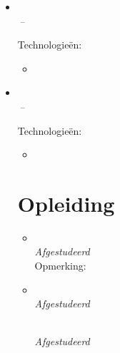 \documentclass[11pt,a4paper]{article}
\begin{document}
\begin{itemize}[leftmargin=0pt,label={},itemsep=2em,topsep=0pt]
\item \parbox{\textwidth}{\textbf{\HSBCNameNL} \hfill \textit{\HSBCLocationNL}}\\
\textit{\HSBCJobTitleNL} \hfill \textit{\HSBCJobStartNL\,--\,\HSBCJobEndNL}

\vspace{0.2cm}
{\color{secondary}Technologieën:} \HSBCTechnologyNL
\vspace{0.3cm}
\begin{itemize}[leftmargin=*,topsep=-6pt,parsep=0pt,partopsep=0pt,itemsep=0pt]
    \item \HSBCShortNL
\end{itemize}


\item \parbox{\textwidth}{\textbf{\LloydsNameNL} \hfill \textit{\LloydsLocationNL}}\\
\textit{\LloydsJobTitleNL} \hfill \textit{\LloydsJobStartNL\,--\,\LloydsJobEndNL}

\vspace{0.2cm}
{\color{secondary}Technologieën:} \LloydsTechnologyNL
\vspace{0.3cm}
\begin{itemize}[leftmargin=*,topsep=-6pt,parsep=0pt,partopsep=0pt,itemsep=0pt]
    \item \LloydsShortNL
\end{itemize}


\vspace{0.5cm}
\section{Opleiding}
\begin{itemize}[leftmargin=0pt,label={},itemsep=2em]
\item \parbox{\textwidth}{\textbf{\MasterUniversityNL} \hfill \textit{\MasterLocationNL}}\\
\textit{\MasterCourseNL} \hfill \textit{Afgestudeerd \MasterGraduationNL}\\[2pt]
{\color{secondary}Opmerking:} \textit{\MastersNotableAchievementNL}


\item \parbox{\textwidth}{\textbf{\BatchelorsUniversityNL} \hfill \textit{\BatchelorsLocationNL}}\\
\textit{\BatchelorsCourseNL} \hfill \textit{Afgestudeerd \BatchelorsGraduationNL}
\parbox{\textwidth}{\textbf{\HEAOHogeschoolNL} \hfill \textit{\HEAOsLocationNL}}\\
\textit{\HEAOCourseNL} \hfill \textit{Afgestudeerd \BatchelorsGraduationNL}
\end{itemize}



\end{itemize}
\end{document}
